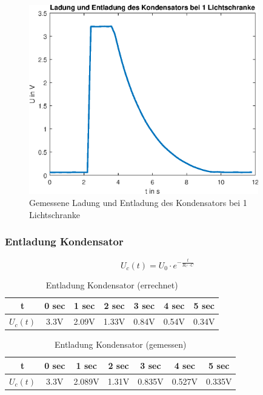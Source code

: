 \newpage

\begin{figure}[htb]
    \includegraphics[width=10cm]{./res/Kondensator_1_Lichtschranke_Messung}
    \caption{Gemessene Ladung und Entladung des Kondensators bei 1 Lichtschranke}
    \label{fig:KondensatorLadungEntladungMess}
\end{figure}

\newpage
\subsubsection{Entladung Kondensator}

\[
U_{c}(t)=U_{0} \cdot e^{- \frac{t}{R_{C} \cdot C}}
\]

\begin{table}[htb]
\centering
\caption{Entladung Kondensator (errechnet)}
\label{KondensatorRechnung}
\begin{tabular}{c|cccccc}
\toprule
t & 0 sec & 1 sec & 2 sec & 3 sec & 4 sec & 5 sec \\
\midrule
$U_{c}(t)$ & 3.3V & 2.09V & 1.33V & 0.84V & 0.54V & 0.34V \\
\bottomrule
\end{tabular}
\end{table}

\begin{table}[htb]
\centering
\caption{Entladung Kondensator (gemessen)}
\label{KondensatorMessung}
\begin{tabular}{c|cccccc}
\toprule
t & 0 sec & 1 sec & 2 sec & 3 sec & 4 sec & 5 sec \\
\midrule
$U_{c}(t)$ & 3.3V & 2.089V & 1.31V & 0.835V & 0.527V & 0.335V \\
\bottomrule
\end{tabular}
\end{table}

